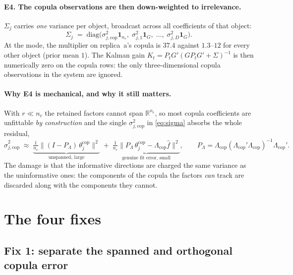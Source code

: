 \documentclass[11pt]{article}
\newcommand{\cop}{\mathrm{cop}}
\newcommand{\diag}{\mathrm{diag}}
\begin{document}
\paragraph{E4. The copula observations are then down-weighted to irrelevance.}
$\Sigma_j$ carries \emph{one} variance per object, broadcast across all
coefficients of that object:
\begin{equation}
  \Sigma_j \;=\; \diag\bigl( \sigma^2_{j,\cop}\mathbf{1}_{n_c},\;
                             \sigma^2_{j,1}\mathbf{1}_{G},\;\ldots,\;
                             \sigma^2_{j,D}\mathbf{1}_{G} \bigr).
  \label{eq:sigma}
\end{equation}
At the mode, the multiplier on replica~a's copula is $37.4$ against $1.3$--$12$
for every other object (prior mean $1$). The Kalman gain
$K_t = P_t G' (G P_t G' + \Sigma)^{-1}$ is then numerically zero on the copula
rows: the only three-dimensional copula observations in the system are ignored.

\paragraph{Why E4 is mechanical, and why it still matters.} With $r \ll n_c$ the
retained factors cannot span $\mathbb{R}^{n_c}$, so most copula coefficients are
unfittable \emph{by construction} and the single $\sigma^2_{j,\cop}$ in
\eqref{eq:sigma} absorbs the whole residual,
\begin{equation}
  \hat\sigma^2_{j,\cop} \;\approx\;
  \underbrace{\tfrac{1}{n_c}\bigl\| (I - P_\Lambda)\,\theta^{\cop}_{j} \bigr\|^2}_{\text{unspanned, large}}
  \;+\;
  \underbrace{\tfrac{1}{n_c}\bigl\| P_\Lambda\,\theta^{\cop}_{j} - \Lambda_{\cop} \hat f \bigr\|^2}_{\text{genuine fit error, small}},
  \qquad P_\Lambda = \Lambda_{\cop}(\Lambda_{\cop}'\Lambda_{\cop})^{-1}\Lambda_{\cop}' .
\end{equation}
The damage is that the informative directions are charged the same variance as
the uninformative ones: the components of the copula the factors \emph{can}
track are discarded along with the components they cannot.

\section{The four fixes}\label{sec:fixes}

\subsection{Fix 1: separate the spanned and orthogonal copula error}
\end{document}
